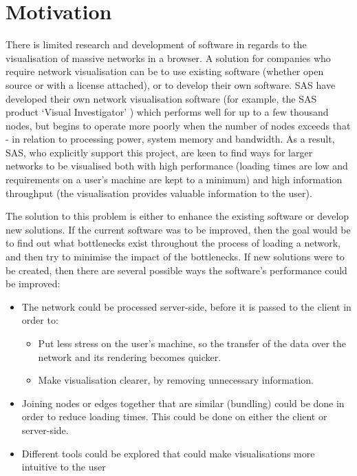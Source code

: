 \documentclass[../dissertation.tex]{subfiles}
\begin{document}
\chapter{Motivation}
\label{chap:motiv}

There is limited research and development of software in regards to the visualisation of massive networks in a browser. A solution for companies who require network visualisation can be to use existing software (whether open source or with a license attached), or to develop their own software. SAS have developed their own network visualisation software (for example, the SAS product `Visual Investigator' \cite{sasvi}) which performs well for up to a few thousand nodes, but begins to operate more poorly when the number of nodes exceeds that - in relation to processing power, system memory and bandwidth. As a result, SAS, who explicitly support this project, are keen to find ways for larger networks to be visualised both with high performance (loading times are low and requirements on a user's machine are kept to a minimum) and high information throughput (the visualisation provides valuable information to the user).

The solution to this problem is either to enhance the existing software or develop new solutions. If the current software was to be improved, then the goal would be to find out what bottlenecks exist throughout the process of loading a network, and then try to minimise the impact of the bottlenecks. If new solutions were to be created, then there are several possible ways the software's performance could be improved:

\begin{itemize}
	\item The network could be processed server-side, before it is passed to the client in order to:
	\begin{itemize}
	    \item Put less stress on the user's machine, so the transfer of the data over the network and its rendering becomes quicker.
	    \item Make visualisation clearer, by removing unnecessary information.
	\end{itemize}
	\item Joining nodes or edges together that are similar (bundling) could be done in order to reduce loading times. This could be done on either the client or server-side.
	\item Different tools could be explored that could make visualisations more intuitive to the user
\end{itemize}
\end{document}
